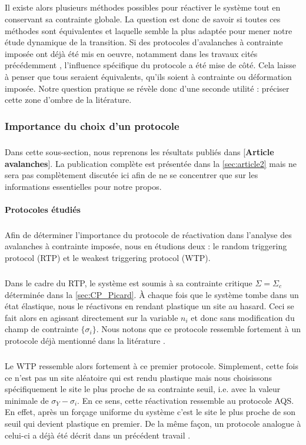 \subparagraph{}Il existe alors plusieurs méthodes possibles pour réactiver le système tout en conservant sa contrainte globale. La question est donc de savoir si toutes ces méthodes sont équivalentes et laquelle semble la plus adaptée pour mener notre étude dynamique de la transition. Si des protocoles d'avalanches à contrainte imposée ont déjà été mis en oeuvre, notamment dans les travaux cités précédemment \cite{budrikis_universal_2017, lin_scaling_2014}, l'influence spécifique du protocole a été mise de côté. Cela laisse à penser que tous seraient équivalents, qu'ils soient à contrainte ou déformation imposée. Notre question pratique se révèle donc d'une seconde utilité : préciser cette zone d'ombre de la litérature.

\subsubsection{Importance du choix d'un protocole}

\label{sec:imp_prot}

\subparagraph{}Dans cette sous-section, nous reprenons les résultats publiés dans [\textbf{Article avalanches}]. La publication complète est présentée dans la \autoref{sec:article2} mais ne sera pas complètement discutée ici afin de ne se concentrer que sur les informations essentielles pour notre propos.

\paragraph{Protocoles étudiés}

\subparagraph{}Afin de déterminer l'importance du protocole de réactivation dans l'analyse des avalanches à contrainte imposée, nous en étudions deux : le random triggering protocol (RTP) et le weakest triggering protocol (WTP).

\subparagraph{}Dans le cadre du RTP, le système est soumis à sa contrainte critique $\Sigma = \Sigma_c$ déterminée dans la \autoref{sec:CP_Picard}. \`A chaque fois que le système tombe dans un état élastique, nous le réactivons en rendant plastique un site au hasard. Ceci se fait alors en agissant directement sur la variable $n_i$ et donc sans modification du champ de contrainte $\{\sigma_i\}$. Nous notons que ce protocole ressemble fortement à un protocole déjà mentionné dans la litérature \cite{lin_scaling_2014}.

\subparagraph{}Le WTP ressemble alors fortement à ce premier protocole. Simplement, cette fois ce n'est pas un site aléatoire qui est rendu plastique mais nous choisissons spécifiquement le site le plus proche de sa contrainte seuil, i.e. avec la valeur minimale de $\sigma_Y - \sigma_i$. En ce sens, cette réactivation ressemble au protocole AQS. En effet, après un forçage uniforme du système c'est le site le plus proche de son seuil qui devient plastique en premier. De la même façon, un protocole analogue à celui-ci a déjà été décrit dans un précédent travail \cite{lin_scaling_2014}.

